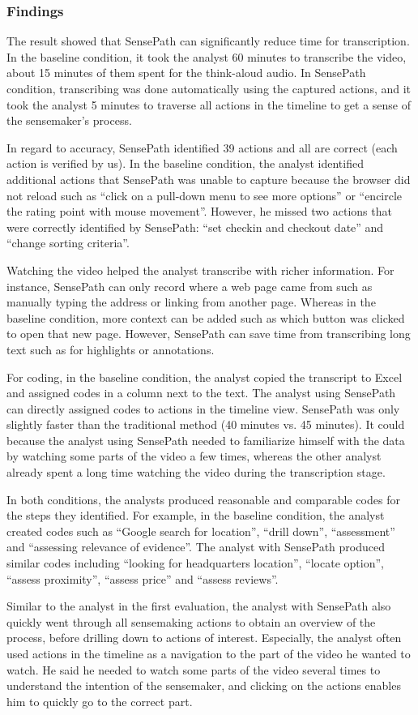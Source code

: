 \subsubsection{Findings}
The result showed that SensePath can significantly reduce time for transcription. In the baseline condition, it took the analyst 60 minutes to transcribe the video, about 15 minutes of them spent for the think-aloud audio. In SensePath condition, transcribing was done automatically using the captured actions, and it took the analyst 5 minutes to traverse all actions in the timeline to get a sense of the sensemaker's process.

In regard to accuracy, SensePath identified 39 actions and all are correct (each action is verified by us). In the baseline condition, the analyst identified additional actions that SensePath was unable to capture because the browser did not reload such as ``click on a pull-down menu to see more options'' or ``encircle the rating point with mouse movement''. However, he missed two actions that were correctly identified by SensePath: ``set checkin and checkout date'' and ``change sorting criteria''.

Watching the video helped the analyst transcribe with richer information. For instance, SensePath can only record where a web page came from such as manually typing the address or linking from another page. Whereas in the baseline condition, more context can be added such as which button was clicked to open that new page. However, SensePath can save time from transcribing long text such as for highlights or annotations.

For coding, in the baseline condition, the analyst copied the transcript to Excel and assigned codes in a column next to the text. The analyst using SensePath can directly assigned codes to actions in the timeline view. SensePath was only slightly faster than the traditional method (40 minutes vs. 45 minutes). It could because the analyst using SensePath needed to familiarize himself with the data by watching some parts of the video a few times, whereas the other analyst already spent a long time watching the video during the transcription stage.

In both conditions, the analysts produced reasonable and comparable codes for the steps they identified. For example, in the baseline condition, the analyst created codes such as ``Google search for location'', ``drill down'', ``assessment'' and ``assessing relevance of evidence''. The analyst with SensePath produced similar codes including ``looking for headquarters location'', ``locate option'', ``assess proximity'', ``assess price'' and ``assess reviews''.

Similar to the analyst in the first evaluation, the analyst with SensePath also quickly went through all sensemaking actions to obtain an overview of the process, before drilling down to actions of interest. Especially, the analyst often used actions in the timeline as a navigation to the part of the video he wanted to watch. He said he needed to watch some parts of the video several times to understand the intention of the sensemaker, and clicking on the actions enables him to quickly go to the correct part.